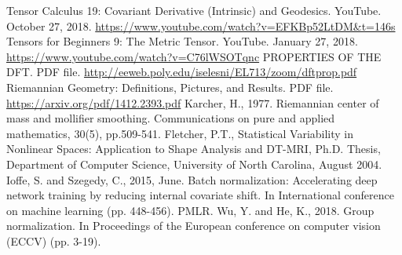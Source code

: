 \documentclass[a4paper]{article}
\theoremstyle{definition}
\theoremstyle{plain}
\begin{document}
\begin{thebibliography}{99}
 Tensor Calculus 19: Covariant Derivative (Intrinsic) and Geodesics. YouTube. October 27, 2018. \url{https://www.youtube.com/watch?v=EFKBp52LtDM&t=146s}
 Tensors for Beginners 9: The Metric Tensor. YouTube. January 27, 2018. \url{https://www.youtube.com/watch?v=C76lWSOTqnc}
 PROPERTIES OF THE DFT. PDF file. \url{http://eeweb.poly.edu/iselesni/EL713/zoom/dftprop.pdf}
 Riemannian Geometry: Definitions, Pictures, and Results. PDF file. \url{https://arxiv.org/pdf/1412.2393.pdf}
 Karcher, H., 1977. Riemannian center of mass and mollifier smoothing. Communications on pure and applied mathematics, 30(5), pp.509-541.
Fletcher, P.T., Statistical Variability in Nonlinear Spaces: Application to Shape Analysis and DT-MRI, Ph.D. Thesis, Department of Computer Science, University of North Carolina, August 2004.
Ioffe, S. and Szegedy, C., 2015, June. Batch normalization: Accelerating deep network training by reducing internal covariate shift. In International conference on machine learning (pp. 448-456). PMLR.
Wu, Y. and He, K., 2018. Group normalization. In Proceedings of the European conference on computer vision (ECCV) (pp. 3-19).
\end{thebibliography}
\end{document}
